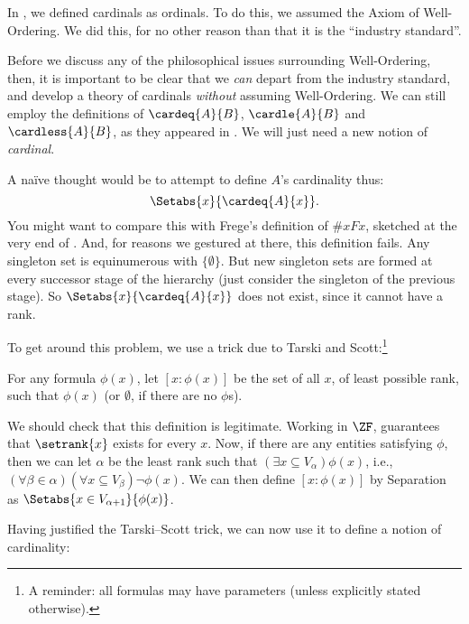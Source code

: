 \documentclass[../../../include/open-logic-section]{subfiles}
\begin{document}

In , we
defined cardinals as ordinals. To do this, we assumed the Axiom of
Well-Ordering. We did this, for no other reason than that it is the
``industry standard''.

Before we discuss any of the philosophical issues surrounding
Well-Ordering, then, it is important to be clear that we \emph{can}
depart from the industry standard, and develop a theory of cardinals
\emph{without} assuming Well-Ordering. We can still employ the
definitions of $\cardeq{A}{B}$, $\cardle{A}{B}$ and $\cardless{A}{B}$,
as they appeared in . We will just need a new
notion of \emph{cardinal}.

A na\"ive thought would be to attempt to define $A$'s cardinality thus:
\[
	\Setabs{x}{\cardeq{A}{x}}.
\]
You might want to compare this with Frege's definition of $\# x Fx$,
sketched at the very end of . And, for
reasons we gestured at there, this definition fails. Any singleton set
is equinumerous with $\{\emptyset\}$. But new singleton sets are
formed at every successor stage of the hierarchy (just consider the
singleton of the previous stage). So $\Setabs{x}{\cardeq{A}{x}}$ does
not exist, since it cannot have a rank.

To get around this problem, we use a trick due to Tarski and Scott:\footnote{A reminder: all formulas may have parameters (unless explicitly stated otherwise).}

\begin{defn}
For any formula $\phi(x)$, let
$[ x : \phi(x)] $ be the set of all $x$, of least possible rank, such
that $\phi(x)$ (or $\emptyset$, if there are no $\phi$s).
\end{defn}

We should check that this definition is legitimate. Working in $\ZF$,
 guarantees that
$\setrank{x}$ exists for every $x$. Now, if there are any entities
satisfying $\phi$, then we can let $\alpha$ be the least rank such
that  $(\exists x\subseteq V_\alpha)\phi(x)$, i.e., $(\forall \beta
\in \alpha)(\forall x \subseteq V_\beta)\lnot \phi(x)$. We can then
define $[x : \phi(x)]$ by Separation as $\Setabs{x \in
V_{\alpha+1}}{\phi(x)}$. 

Having justified the Tarski--Scott trick, we can now use it to define
a notion of cardinality:
\end{document}
